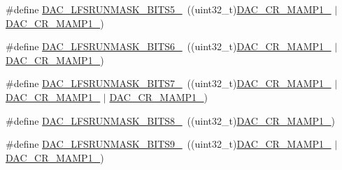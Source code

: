 \begin{DoxyCompactItemize}
\item 
\#define \mbox{\hyperlink{group___d_a_c_ex__lfsrunmask__triangleamplitude_gaf4ddf68e1ca3ff46f9dadc559ac3e16b}{D\+A\+C\+\_\+\+L\+F\+S\+R\+U\+N\+M\+A\+S\+K\+\_\+\+B\+I\+T\+S5\+\_}}~((uint32\+\_\+t)\mbox{\hyperlink{group___peripheral___registers___bits___definition_ga0fefef1d798a2685b03e44bd9fdac06b}{D\+A\+C\+\_\+\+C\+R\+\_\+\+M\+A\+M\+P1\+\_}} $\vert$ \mbox{\hyperlink{group___peripheral___registers___bits___definition_ga4225dcce22b440fcd3a8ad96c5f2baec}{D\+A\+C\+\_\+\+C\+R\+\_\+\+M\+A\+M\+P1\+\_}})
\item 
\#define \mbox{\hyperlink{group___d_a_c_ex__lfsrunmask__triangleamplitude_ga17ee7ec51f948f30e8ff1779033de0a8}{D\+A\+C\+\_\+\+L\+F\+S\+R\+U\+N\+M\+A\+S\+K\+\_\+\+B\+I\+T\+S6\+\_}}~((uint32\+\_\+t)\mbox{\hyperlink{group___peripheral___registers___bits___definition_ga0fefef1d798a2685b03e44bd9fdac06b}{D\+A\+C\+\_\+\+C\+R\+\_\+\+M\+A\+M\+P1\+\_}} $\vert$ \mbox{\hyperlink{group___peripheral___registers___bits___definition_ga6cc15817842cb7992d449c448684f68d}{D\+A\+C\+\_\+\+C\+R\+\_\+\+M\+A\+M\+P1\+\_}})
\item 
\#define \mbox{\hyperlink{group___d_a_c_ex__lfsrunmask__triangleamplitude_ga5ec6464589b3c0d11fff052fbccc6fde}{D\+A\+C\+\_\+\+L\+F\+S\+R\+U\+N\+M\+A\+S\+K\+\_\+\+B\+I\+T\+S7\+\_}}~((uint32\+\_\+t)\mbox{\hyperlink{group___peripheral___registers___bits___definition_ga0fefef1d798a2685b03e44bd9fdac06b}{D\+A\+C\+\_\+\+C\+R\+\_\+\+M\+A\+M\+P1\+\_}} $\vert$ \mbox{\hyperlink{group___peripheral___registers___bits___definition_ga6cc15817842cb7992d449c448684f68d}{D\+A\+C\+\_\+\+C\+R\+\_\+\+M\+A\+M\+P1\+\_}} $\vert$ \mbox{\hyperlink{group___peripheral___registers___bits___definition_ga4225dcce22b440fcd3a8ad96c5f2baec}{D\+A\+C\+\_\+\+C\+R\+\_\+\+M\+A\+M\+P1\+\_}})
\item 
\#define \mbox{\hyperlink{group___d_a_c_ex__lfsrunmask__triangleamplitude_gab70bea148433b9f831806e7f952f6436}{D\+A\+C\+\_\+\+L\+F\+S\+R\+U\+N\+M\+A\+S\+K\+\_\+\+B\+I\+T\+S8\+\_}}~((uint32\+\_\+t)\mbox{\hyperlink{group___peripheral___registers___bits___definition_gafdc83b4feb742c632ba66f55d102432b}{D\+A\+C\+\_\+\+C\+R\+\_\+\+M\+A\+M\+P1\+\_}})
\item 
\#define \mbox{\hyperlink{group___d_a_c_ex__lfsrunmask__triangleamplitude_ga06a92bab781b83f69c86e5692f8b175e}{D\+A\+C\+\_\+\+L\+F\+S\+R\+U\+N\+M\+A\+S\+K\+\_\+\+B\+I\+T\+S9\+\_}}~((uint32\+\_\+t)\mbox{\hyperlink{group___peripheral___registers___bits___definition_gafdc83b4feb742c632ba66f55d102432b}{D\+A\+C\+\_\+\+C\+R\+\_\+\+M\+A\+M\+P1\+\_}} $\vert$ \mbox{\hyperlink{group___peripheral___registers___bits___definition_ga4225dcce22b440fcd3a8ad96c5f2baec}{D\+A\+C\+\_\+\+C\+R\+\_\+\+M\+A\+M\+P1\+\_}})

\end{DoxyCompactItemize}
